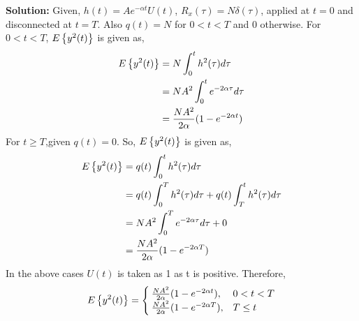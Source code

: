 \documentclass[journal,12pt,twocolumn]{IEEEtran}
\begin{document}
	\textbf{Solution:}
	Given, $h(t) = Ae^{-\alpha t}U(t)$, $R_x(\tau)=N\delta(\tau)$, applied at $t=0$ and disconnected at $t=T$. Also $q(t)=N$ for $0<t<T$ and 0 otherwise. For $0<t<T$, $E\left\{y^2(t)\right\}$ is given as,
	\begin{align}
	       E\left\{y^2(t)\right\} &= N\int_{0}^{t}h^2(\tau)d\tau \\
	                       &= NA^2\int_{0}^{t}e^{-2\alpha\tau}d\tau \\
	                       &= \frac{NA^2}{2\alpha}(1-e^{-2\alpha t})
    \end{align}
    For $t\ge T$,given $q(t)=0$. So, $E\left\{y^2(t)\right\}$ is given as,
    \begin{align}
           E\left\{y^2(t)\right\} &= q(t)\int_{0}^{t}h^2(\tau)d\tau \\
	                       &= q(t)\int_{0}^{T}h^2(\tau)d\tau + q(t)\int_{T}^{t}h^2(\tau)d\tau \\
	                       &= NA^2\int_{0}^{T}e^{-2\alpha\tau}d\tau + 0 \\ 
	                       &= \frac{NA^2}{2\alpha}(1-e^{-2\alpha T})
    \end{align}
    In the above cases $U(t)$ is taken as 1 as t is positive.
    Therefore,
    \begin{equation*}
           E\left\{y^2(t)\right\} = \begin{cases}
                              \frac{NA^2}{2\alpha}(1-e^{-2\alpha t}),  & 0<t<T \\
                              \frac{NA^2}{2\alpha}(1-e^{-2\alpha T}),  & T\le t
                             \end{cases}
    \end{equation*}
\end{document}
